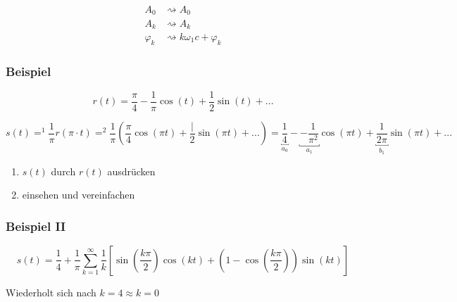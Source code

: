 \begin{align*}
A_0 &\rightsquigarrow A_0 \\
A_k &\rightsquigarrow A_k \\
\varphi_k &\rightsquigarrow k \omega_1 c + \varphi_k
\end{align*}

\subsubsection{Beispiel}


\[
	r(t) = \frac{\pi}{4} - \frac{1}{\pi} \cos(t) + \frac{1}{2} \sin(t) + ...
\]

\[
	s(t) =^1 \frac{1}{\pi} r( \pi \cdot t) =^2 \frac{1}{\pi} \left( \frac{\pi}{4} \cos(\pi t) + \frac{|}{2} \sin(\pi t) + ... \right) = \underbracket{\frac{1}{4}}_{a_0} - \underbracket{- \frac{1}{\pi^2}}_{a_1} \cos(\pi t) + \underbracket{\frac{1}{2 \pi}}_{b_1} \sin(\pi t) + ...
\]

\begin{enumerate}
	\item $s(t)$ durch $r(t)$ ausdrücken
	\item einsehen und vereinfachen
	\end{enumerate}


\subsubsection{Beispiel II}

\[
s(t) = \frac{1}{4} + \frac{1}{\pi} \sum^\infty_{k=1} \frac{1}{k} \left[ \sin\left(\frac{k \pi}{2}\right) \cos(k t) + \left(1 - \cos\left(\frac{k \pi}{2}\right)\right) \sin(kt) \right]
\]

Wiederholt sich nach $k=4 \approx k=0$

